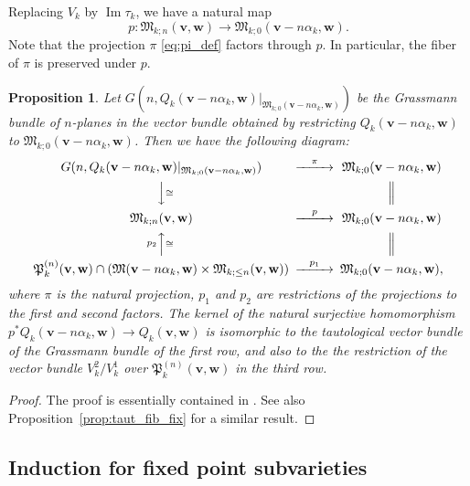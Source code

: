 \documentclass[12pt]{amsart}
\def\frak{\mathfrak}
\newcommand{\rom}{\textup}
\newtheorem{Proposition}[equation]{Proposition}
\theoremstyle{definition}
\theoremstyle{remark}
\numberwithin{equation}{subsection}
\newcommand{\propref}[1]{Proposition~\ref{#1}}
\newcommand{\Ima}{\operatorname{Im}}
\newcommand{\M}{{\frak M}} %
\newcommand{\bv}{{\mathbf v}} %
\newcommand{\bw}{{\mathbf w}} %
\newcommand{\bC}{{\mathbf C}} %
\newcommand{\Pa}{{\frak P}} %
\begin{document}
Replacing $V_k$ by $\Ima\tau_k$, we have a
natural map
\begin{equation}\label{taut:induct}
  p\colon \M_{k;n}(\bv,\bw) \to \M_{k;0}(\bv - n\alpha_k,\bw).
\end{equation}
Note that the projection $\pi$ \eqref{eq:pi_def} factors through
$p$. In particular, the fiber of $\pi$ is preserved under $p$.

\begin{Proposition}\label{prop:taut_fib}
Let $G(n,Q_k(\bv - n\alpha_k,\bw)|_{\M_{k;0}(\bv-n\alpha_k,\bw)})$ be
the Grassmann bundle of $n$-planes in
the vector bundle 
obtained by restricting $Q_k(\bv - n\alpha_k,\bw)$ to
$\M_{k;0}(\bv-n\alpha_k,\bw)$.
%
Then
%
we have the following diagram:
\begin{equation*}
\begin{CD}
   G(n,Q_k(\bv - n\alpha_k,\bw)|_{\M_{k;0}(\bv-n\alpha_k,\bw)})
     @>\pi>> \M_{k;0}(\bv - n\alpha_k,\bw) \\
   @VV{\cong}V @| \\
   \M_{k;n}(\bv,\bw) @>p>> \M_{k;0}(\bv - n\alpha_k,\bw) \\
   @A{p_2}A{\cong}A @| \\
   \Pa_k^{(n)}(\bv,\bw)
   \cap(\M(\bv-n\alpha_k,\bw)\times\M_{k;\le n}(\bv,\bw))
   @>{p_1}>>
   \M_{k;0}(\bv-n\alpha_k,\bw),
\end{CD}
\end{equation*}
where $\pi$ is the natural projection,
$p_1$ and $p_2$ are restrictions of the projections to the first
and second factors. 
%
The kernel of the natural surjective homomorphism
\(
   p^* Q_k(\bv - n\alpha_k,\bw) \to Q_k(\bv,\bw)
\)
is isomorphic to the tautological vector bundle of the Grassmann
bundle of the first row, and also to the
the restriction of the vector bundle $V_k^2/V_k^1$ over
$\Pa_k^{(n)}(\bv,\bw)$ in the third row.
\end{Proposition}

\begin{proof}
The proof is essentially contained in \cite[4.5]{Na-alg}.
See also \propref{prop:taut_fib_fix} for a similar result.
\end{proof}

\subsection{Induction for fixed point subvarieties}
\end{document}
